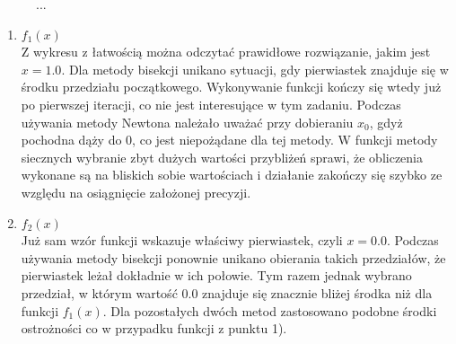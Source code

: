 \documentclass{classrep}
\begin{document}
		\begin{figure}[!htbp]
			\centering
			 \hfill
  			\caption{...}
  			\label{fig:2}
		\end{figure}		
		
	
		\begin{enumerate}[1)]
			\item $f_1(x)$ \\
			Z wykresu z łatwością można odczytać prawidłowe rozwiązanie, jakim jest $x=1.0$.
			Dla metody bisekcji unikano sytuacji, gdy pierwiastek znajduje się w środku przedziału początkowego. Wykonywanie funkcji kończy się wtedy już po pierwszej iteracji, co nie jest interesujące w tym zadaniu.
			Podczas używania metody Newtona należało uważać przy dobieraniu $x_0$, gdyż pochodna dąży do $0$, co jest niepożądane dla tej metody.
			W funkcji metody siecznych wybranie zbyt dużych wartości przybliżeń sprawi, że obliczenia wykonane są na bliskich sobie wartościach i działanie zakończy się szybko ze względu na osiągnięcie założonej precyzji.
			
			\item $f_2(x)$ \\
			Już sam wzór funkcji wskazuje właściwy pierwiastek, czyli $x=0.0$. Podczas używania metody bisekcji ponownie unikano obierania takich przedziałów, że pierwiastek leżał dokładnie w ich połowie. Tym razem jednak wybrano przedział, w którym wartość $0.0$ znajduje się znacznie bliżej środka niż dla funkcji $f_1(x)$. 
		Dla pozostałych dwóch metod zastosowano podobne środki ostrożności co w przypadku funkcji z punktu 1).
		\end{enumerate}
		
\end{document}
